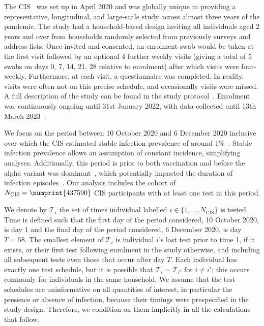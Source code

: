 \documentclass[12pt]{article}
\makeatletter
\newcommand{\Ncis}{N_\text{CIS}}
\newcommand{\sched}{\mathcal{T}}
\DeclareRobustCommand\onedot{\futurelet\@let@token\@onedot}
\def\@onedot{\ifx\@let@token.\else.\null\fi\xspace}
\def\eg{e.g\onedot} \def\Eg{{E.g}\onedot}
\makeatother
\begin{document}
The CIS~\citep{CIS} was set up in April 2020 and was globally unique in providing a representative, longitudinal, and large-scale study across almost three years of the pandemic.
The study had a household-based design inviting all individuals aged 2 years and over from households randomly selected from previously surveys and address lists.
Once invited and consented, an enrolment swab would be taken at the first visit followed by an optional 4 further weekly visits (giving a total of 5 swabs on days 0, 7, 14, 21, 28 relative to enrolment) after which visits were four-weekly. Furthermore, at each visit, a questionnaire was completed.  In reality, visits were often not on this precise schedule, and occasionally visits were missed. %
A full description of the study can be found in the study protocol~\citep{cisProtocol}.
Enrolment was continuously ongoing until 31st January 2022, with data collected until 13th March 2023~\citep{weiRisk}. 

We focus on the period between 10 October 2020 and 6 December 2020 inclusive over which the CIS estimated stable infection prevalence of around 1\%~\citep{onsCISdec2020}.
Stable infection prevalence allows an assumption of constant incidence, simplifying analyses.
Additionally, this period is prior to both vaccination and before the alpha variant was dominant~\citep{lythgoeLineage}, which potentially impacted the duration of infection episodes~\citep{hakkiOnset,russellWithinhost}.
Our analysis includes the cohort of $\Ncis = \numprint{437590}$ CIS participants with at least one test in this period.

We denote by $\sched_i$ the set of times individual labelled $i \in \{ 1, \dots, \Ncis \}$ is tested.
Time is defined such that the first day of the period considered, 10 October 2020, is day 1 and the final day of the period considered, 6 December 2020, is day $T = 58$.
The smallest element of $\sched_i$ is individual $i$'s last test prior to time 1, if it exists, or their first test following enrolment in the study otherwise, and including all subsequent tests even those that occur after day $T$.
Each individual has exactly one test schedule, but it is possible that $\sched_i = \sched_{i'}$ for $i \neq i'$; this occurs commonly for individuals in the same household.
We assume that the test schedules are uninformative on all quantities of interest, in particular the presence or absence of infection, because their timings were prespecified in the study design.
Therefore, we condition on them implicitly in all the calculations that follow.
\end{document}
